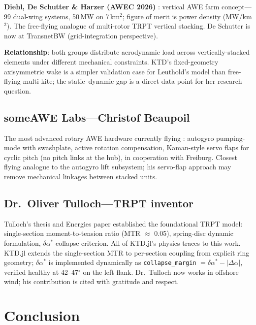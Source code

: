 \documentclass[11pt,a4paper]{article}
\begin{document}
\textbf{Diehl, De Schutter \& Harzer (AWEC 2026)} \cite{diehl2026}: vertical AWE farm
concept---99 dual-wing systems, 50\,MW on 7\,km$^2$; figure of merit is power density (MW/km$^2$).
The free-flying analogue of multi-rotor TRPT vertical stacking.
De Schutter is now at TransnetBW (grid-integration perspective).

\textbf{Relationship}: both groups distribute aerodynamic load across vertically-stacked
elements under different mechanical constraints.
KTD's fixed-geometry axisymmetric wake is a simpler validation case for Leuthold's model
than free-flying multi-kite; the static--dynamic gap is a direct data point for her research question.

\subsection{someAWE Labs---Christof Beaupoil}

The most advanced rotary AWE hardware currently flying \cite{beaupoil2026}:
autogyro pumping-mode with swashplate, active rotation compensation, Kaman-style servo flaps
for cyclic pitch (no pitch links at the hub), in cooperation with Freiburg.
Closest flying analogue to the autogyro lift subsystem; his servo-flap approach may remove
mechanical linkages between stacked units.

\subsection{Dr.\ Oliver Tulloch---TRPT inventor}

Tulloch's thesis \cite{tulloch2021} and Energies paper \cite{tulloch2023} established the
foundational TRPT model: single-section moment-to-tension ratio (MTR $\approx$ 0.05),
spring-disc dynamic formulation, $\delta\alpha^*$ collapse criterion.
All of KTD.jl's physics traces to this work.
KTD.jl extends the single-section MTR to per-section coupling from explicit ring geometry;
$\delta\alpha^*$ is implemented dynamically as \texttt{collapse\_margin} $= \delta\alpha^* - |\Delta\alpha|$,
verified healthy at 42--47$^\circ$ on the left flank.
Dr.\ Tulloch now works in offshore wind; his contribution is cited with gratitude and respect.

\section{Conclusion}
\end{document}
